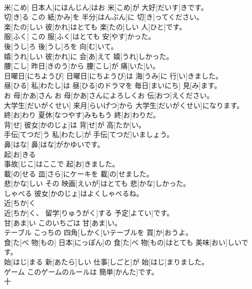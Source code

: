 \documentclass[8pt]{extreport}
\begin{document}
\begin{CJK}{UTF8}{min}
\\	米[こめ]	日本人[にほんじん]はお 米[こめ]が 大好[だいす]きです。		
\\	切[き]る	この 紙[かみ]を 半分[はんぶん]に 切[き]ってください。		
\\	楽[たの]しい	彼[かれ]はとても 楽[たの]しい 人[ひと]です。		
\\	服[ふく]	この 服[ふく]はとても 安[やす]かった。		
\\	後[うし]ろ	後[うし]ろを 向[む]いて。		
\\	嬉[うれ]しい	彼[かれ]に 会[あ]えて 嬉[うれ]しかった。		
\\	腰[こし]	昨日[きのう]から 腰[こし]が 痛[いた]い。		
\\	日曜日[にちようび]	日曜日[にちようび]は 海[うみ]に 行[い]きました。		
\\	昼[ひる]	私[わたし]は 昼[ひる]のドラマを 毎日[まいにち] 見[み]ます。		
\\	お 母[かあ]さん	お 母[かあ]さんによろしくお 伝[おつ]えください。		
\\	大学生[だいがくせい]	来月[らいげつ]から 大学生[だいがくせい]になります。		
\\	終[お]わり	夏休[なつやす]みももう 終[お]わりだ。		
\\	背[せ]	彼女[かのじょ]は 背[せ]が 高[たか]い。		
\\	手伝[てつだ]う	私[わたし]が 手伝[てつだ]いましょう。		
\\	鼻[はな]	鼻[はな]がかゆいです。		
\\	起[お]きる
\\	事故[じこ]はここで 起[お]きました。		
\\	載[の]せる	皿[さら]にケーキを 載[の]せました。		
\\	悲[かな]しい	その 映画[えいが]はとても 悲[かな]しかった。		
\\	しゃべる	彼女[かのじょ]はよくしゃべるね。		
\\	近[ちか]く 
\\	近[ちか]く、 留学[りゅうがく]する 予定[よてい]です。		
\\	甘[あま]い	このいちごは 甘[あま]い。		
\\	テーブル	こっちの 四角[しかく]いテーブルを 買[か]おうよ。		
\\	食[た]べ 物[もの]	日本[にっぽん]の 食[た]べ 物[もの]はとても 美味[おい]しいです。		
\\	始[はじ]まる	新[あたら]しい 仕事[しごと]が 始[はじ]まりました。		
\\	ゲーム	このゲームのルールは 簡単[かんた]です。		
\\	十

\end{CJK}
\end{document}
